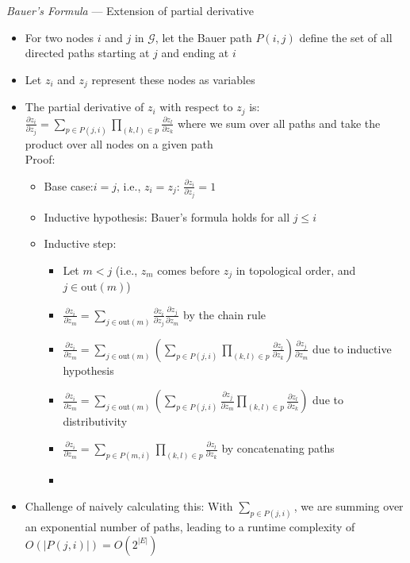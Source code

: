 \emph{Bauer's Formula} --- Extension of partial derivative
\begin{itemize}
    \item For two nodes $i$ and $j$ in $\mathcal{G}$, let the Bauer path $P(i, j)$ define the set of all directed paths starting at $j$ and ending at $i$
    \item Let $z_i$ and $z_j$ represent these nodes as variables
    \item The partial derivative of $z_i$ with respect to $z_j$ is:
    $
    \frac{\partial z_i}{\partial z_j} = \sum_{p \in P(j, i)} \prod_{(k, l) \in p} \frac{\partial z_l}{\partial z_k}
    $ where we sum over all paths and take the product over all nodes on a given path\\
    Proof:
    \begin{itemize}
        \item Base case:$i = j$, i.e., $z_i = z_j$:
        $\frac{\partial z_i}{\partial z_j} = 1$
        \item Inductive hypothesis: Bauer's formula holds for all $j \leq i$
        \item Inductive step:
        \begin{itemize}
            \item Let $m < j$ (i.e., $z_m$ comes before $z_j$ in topological order, and $j \in \textrm{out}(m)$)
            \item $
            \frac{\partial z_i}{\partial z_m} = \sum_{j \in \textrm{out}(m)} \frac{\partial z_i}{\partial z_j} \frac{\partial z_j}{\partial z_m}
            $ by the chain rule
            \item $
            \frac{\partial z_i}{\partial z_m} = \sum_{j \in \textrm{out}(m)} (\sum_{p \in P(j, i)} \prod_{(k, l) \in p} \frac{\partial z_l}{\partial z_k}) \frac{\partial z_j}{\partial z_m}
            $ due to inductive hypothesis
            \item $
            \frac{\partial z_i}{\partial z_m} = \sum_{j \in \textrm{out}(m)} (\sum_{p \in P(j, i)} \frac{\partial z_j}{\partial z_m} \prod_{(k, l) \in p} \frac{\partial z_l}{\partial z_k})
            $ due to distributivity
            \item $
            \frac{\partial z_i}{\partial z_m} = \sum_{p \in P(m, i)} \prod_{(k, l) \in p} \frac{\partial z_l}{\partial z_k}
            $ by concatenating paths
            \item 
        \end{itemize}
    \end{itemize}
    \item Challenge of naively calculating this: With $\sum_{p \in P(j, i)}$, we are summing over an exponential number of paths, leading to a runtime complexity of $O(|P(j, i)|) = O(2^{|E|})$ 
\end{itemize} 

